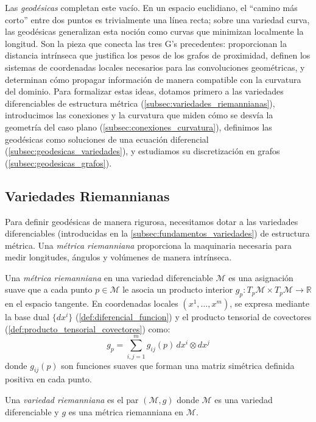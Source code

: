 Las \textit{geodésicas} completan este vacío. En un espacio euclidiano, el ``camino más corto'' entre dos puntos es trivialmente una línea recta; sobre una variedad curva, las geodésicas generalizan esta noción como curvas que minimizan localmente la longitud. Son la pieza que conecta las tres G's precedentes: proporcionan la distancia intrínseca que justifica los pesos de los grafos de proximidad, definen los sistemas de coordenadas locales necesarios para las convoluciones geométricas, y determinan cómo propagar información de manera compatible con la curvatura del dominio. Para formalizar estas ideas, dotamos primero a las variedades diferenciables de estructura métrica (\autoref{subsec:variedades_riemannianas}), introducimos las conexiones y la curvatura que miden cómo se desvía la geometría del caso plano (\autoref{subsec:conexiones_curvatura}), definimos las geodésicas como soluciones de una ecuación diferencial (\autoref{subsec:geodesicas_variedades}), y estudiamos su discretización en grafos (\autoref{subsec:geodesicas_grafos}).

\subsection{Variedades Riemannianas}\label{subsec:variedades_riemannianas}

Para definir geodésicas de manera rigurosa, necesitamos dotar a las variedades diferenciables (introducidas en la \autoref{subsec:fundamentos_variedades}) de estructura métrica. Una \textit{métrica riemanniana} proporciona la maquinaria necesaria para medir longitudes, ángulos y volúmenes de manera intrínseca.

\begin{definition}\label{def:metrica_riemanniana}
Una \textit{métrica riemanniana} en una variedad diferenciable $\mathcal{M}$ es una asignación suave que a cada punto $p \in \mathcal{M}$ le asocia un producto interior $g_p: T_p\mathcal{M} \times T_p\mathcal{M} \to \mathbb{R}$ en el espacio tangente. En coordenadas locales $(x^1, \ldots, x^m)$, se expresa mediante la base dual $\{dx^i\}$ (\autoref{def:diferencial_funcion}) y el producto tensorial de covectores (\autoref{def:producto_tensorial_covectores}) como:
\[
g_p = \sum_{i,j=1}^m g_{ij}(p) \, dx^i \otimes dx^j
\]
donde $g_{ij}(p)$ son funciones suaves que forman una matriz simétrica definida positiva en cada punto.
\end{definition}

\begin{definition}\label{def:variedad_riemanniana}
Una \textit{variedad riemanniana} es el par $(\mathcal{M}, g)$ donde $\mathcal{M}$ es una variedad diferenciable y $g$ es una métrica riemanniana en $\mathcal{M}$.
\end{definition}

